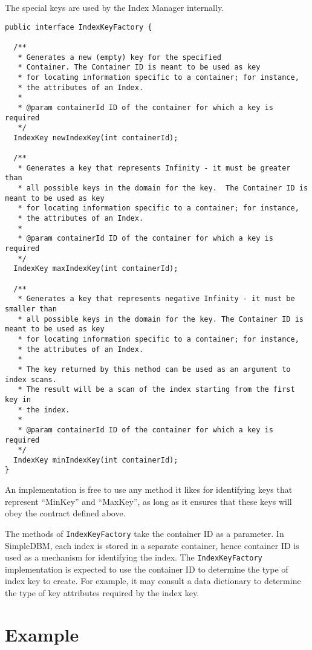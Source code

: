 \documentclass[a4paper,draft,oneside]{book}
\begin{document}
The special keys are used by the Index Manager internally.

\begin{verbatim}
public interface IndexKeyFactory {

  /**
   * Generates a new (empty) key for the specified
   * Container. The Container ID is meant to be used as key
   * for locating information specific to a container; for instance,
   * the attributes of an Index.
   * 
   * @param containerId ID of the container for which a key is required
   */
  IndexKey newIndexKey(int containerId);

  /**
   * Generates a key that represents Infinity - it must be greater than
   * all possible keys in the domain for the key.  The Container ID is meant to be used as key
   * for locating information specific to a container; for instance,
   * the attributes of an Index.
   * 
   * @param containerId ID of the container for which a key is required
   */
  IndexKey maxIndexKey(int containerId);
	
  /**
   * Generates a key that represents negative Infinity - it must be smaller than
   * all possible keys in the domain for the key. The Container ID is meant to be used as key
   * for locating information specific to a container; for instance,
   * the attributes of an Index.
   *
   * The key returned by this method can be used as an argument to index scans.
   * The result will be a scan of the index starting from the first key in 
   * the index.
   * 
   * @param containerId ID of the container for which a key is required
   */
  IndexKey minIndexKey(int containerId);
}
\end{verbatim}

An implementation is free to use any method it likes for 
identifying keys that represent ``MinKey'' and ``MaxKey'', as long as it ensures
that these keys will obey the contract defined above.

The methods of \verb|IndexKeyFactory| take the container ID as
a parameter. In SimpleDBM, each index is stored in a separate container,
hence container ID is used as a mechanism for identifying the index.
The \verb|IndexKeyFactory| implementation is expected to use the
container ID to determine the type of index key to create. For example, it may
consult a data dictionary to determine the type of key attributes required
by the index key.

\section{Example}
\end{document}
